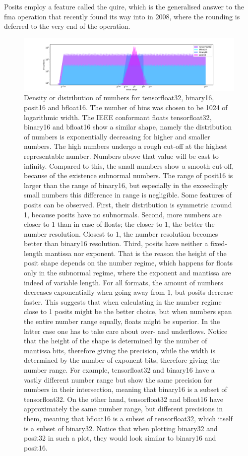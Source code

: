 \documentclass{article}
\theoremstyle{plain} %
\theoremstyle{convention} %
\theoremstyle{remark} %
\numberwithin{equation}{section}
\begin{document}
Posits employ a feature called the \gls{quire}, which is the generalised answer to the \gls{fma} operation that recently found its way into \cite{ieee754_2008} in 2008, where the rounding is deferred to the very end of the operation.

\begin{figure}
    \centering
    \includegraphics[width=1.0\textwidth]{plots/number_line}
    \caption{Density or distribution of numbers for \gls{tensorfloat32}, \gls{binary16}, \gls{posit16} and \gls{bfloat16}. The number of bins was chosen to be \num{1024} of logarithmic width. The IEEE conformant floats \gls{tensorfloat32}, \gls{binary16} and \gls{bfloat16} show a similar shape, namely the distribution of numbers is exponentially decreasing for higher and smaller numbers. The high numbers undergo a rough cut-off at the highest representable number. Numbers above that value will be cast to infinity. Compared to this, the small numbers show a smooth cut-off, because of the existence subnormal numbers. The range of \gls{posit16} is larger than the range of \gls{binary16}, but especially in the exceedingly small numbers this difference in range is negligible. Some features of posits can be observed. First, their distribution is symmetric around \num{1}, because posits have no subnormals. Second, more numbers are closer to \num{1} than in case of floats; the closer to \num{1}, the better the number resolution. Closest to \num{1}, the number resolution becomes better than \gls{binary16} resolution. Third, posits have neither a fixed-length mantissa nor exponent. That is the reason the height of the posit shape depends on the number regime, which happens for floats only in the subnormal regime, where the exponent and mantissa are indeed of variable length. For all formats, the amount of numbers decreases exponentially when going away from \num{1}, but posits decrease faster. This suggests that when calculating in the number regime close to \num{1} posits might be the better choice, but when numbers span the entire number range equally, floats might be superior. In the latter case one has to take care about over- and underflows. Notice that the height of the shape is determined by the number of mantissa bits, therefore giving the precision, while the width is determined by the number of exponent bits, therefore giving the number range. For example, \gls{tensorfloat32} and \gls{binary16} have a vastly different number range but show the same precision for numbers in their intersection, meaning that \gls{binary16} is a subset of \gls{tensorfloat32}. On the other hand, \gls{tensorfloat32} and \gls{bfloat16} have approximately the same number range, but different precisions in them, meaning that \gls{bfloat16} is a subset of \gls{tensorfloat32}, which itself is a subset of \gls{binary32}. Notice that when plotting \gls{binary32} and \gls{posit32} in such a plot, they would look similar to \gls{binary16} and \gls{posit16}.}

\end{figure}
\end{document}
